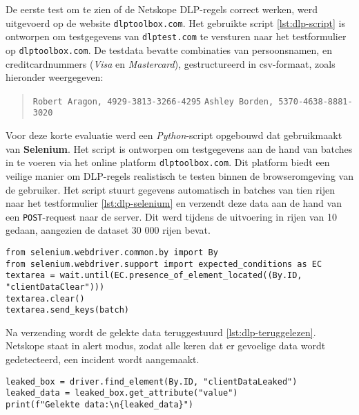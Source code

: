 De eerste test om te zien of de Netskope DLP-regels correct werken, werd uitgevoerd op de website \texttt{dlptoolbox.com}.
Het gebruikte script \ref{lst:dlp-script} is ontworpen om testgegevens van \texttt{dlptest.com} te versturen naar het testformulier op \texttt{dlptoolbox.com}.
De testdata bevatte combinaties van persoonsnamen, en creditcardnummers (\textit{Visa} en \textit{Mastercard}), gestructureerd in \gls{csv}-formaat, zoals hieronder weergegeven:

\begin{quote}\small
\texttt{Robert Aragon, 4929-3813-3266-4295} \newline
\texttt{Ashley Borden, 5370-4638-8881-3020}
\end{quote}

Voor deze korte evaluatie werd een \textit{Python}-script opgebouwd dat gebruikmaakt van \textbf{Selenium}. 
Het script is ontworpen om testgegevens aan de hand van batches in te voeren via het online platform \texttt{dlptoolbox.com}.
Dit platform biedt een veilige manier om DLP-regels realistisch te testen binnen de browseromgeving van de gebruiker.
Het script stuurt gegevens automatisch in batches van tien rijen naar het testformulier \ref{lst:dlp-selenium} en verzendt deze data aan de hand van een \texttt{POST}-request naar de server.
Dit werd tijdens de uitvoering in rijen van 10 gedaan, aangezien de dataset \autocite{DLPTest2025Sample} 30 000 rijen bevat.

{\small
\begin{lstlisting}[style=custompython,caption={Versturen van batches via Selenium},label={lst:dlp-selenium}, captionpos=b, basicstyle=\small\ttfamily]
from selenium.webdriver.common.by import By
from selenium.webdriver.support import expected_conditions as EC
textarea = wait.until(EC.presence_of_element_located((By.ID, "clientDataClear")))
textarea.clear()
textarea.send_keys(batch)
\end{lstlisting}
}

Na verzending wordt de gelekte data teruggestuurd \ref{lst:dlp-teruggelezen}. Netskope staat in alert modus, zodat alle keren dat er gevoelige data wordt gedetecteerd, een incident wordt aangemaakt. 

{\small
\begin{lstlisting}[style=custompython, caption={Versturen van batches via Selenium},label={lst:dlp-teruggelezen}, captionpos=b, basicstyle=\small\ttfamily]
leaked_box = driver.find_element(By.ID, "clientDataLeaked")
leaked_data = leaked_box.get_attribute("value")
print(f"Gelekte data:\n{leaked_data}")
\end{lstlisting}
}

